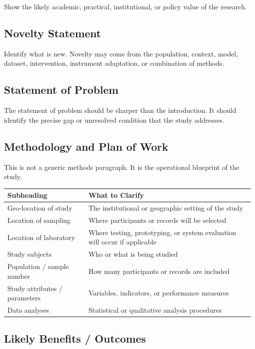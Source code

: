 \documentclass[11pt,a4paper]{article}
\begin{document}
Show the likely academic, practical, institutional, or policy value of the research.

\subsection{Novelty Statement}

Identify what is new. Novelty may come from the population, context, model, dataset, intervention, instrument adaptation, or combination of methods.

\subsection{Statement of Problem}

The statement of problem should be sharper than the introduction. It should identify the precise gap or unresolved condition that the study addresses.

\subsection{Methodology and Plan of Work}

This is not a generic methods paragraph. It is the operational blueprint of the study.

\begin{longtable}{L{3.7cm}L{7.7cm}}
\toprule
\textbf{Subheading} & \textbf{What to Clarify} \\
\midrule
Geo-location of study & The institutional or geographic setting of the study \\
Location of sampling & Where participants or records will be selected \\
Location of laboratory & Where testing, prototyping, or system evaluation will occur if applicable \\
Study subjects & Who or what is being studied \\
Population / sample number & How many participants or records are included \\
Study attributes / parameters & Variables, indicators, or performance measures \\
Data analyses & Statistical or qualitative analysis procedures \\
\bottomrule
\end{longtable}

\subsection{Likely Benefits / Outcomes}
\end{document}
